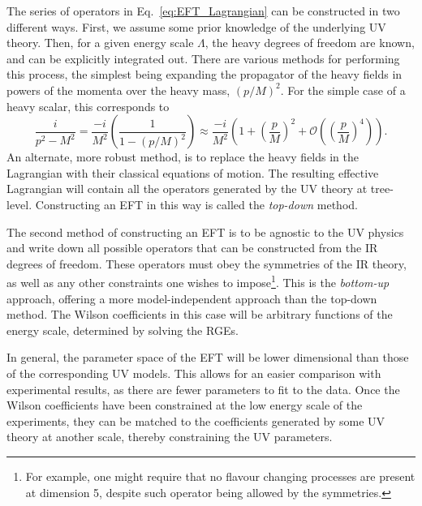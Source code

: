 The series of operators in Eq.~\ref*{eq:EFT_Lagrangian} can be constructed in two different ways. First, we assume some prior knowledge of the underlying UV theory. Then, for a given energy scale $\Lambda$, the heavy degrees of freedom are known, and can be explicitly integrated out. There are various methods for performing this process, the simplest being expanding the propagator of the heavy fields in powers of the momenta over the heavy mass, $(p/M)^2$. For the simple case of a heavy scalar, this corresponds to 
\begin{equation}
    \frac{i}{p^2 - M^2} = \frac{-i}{M^2}\left(\frac{1}{1 - (p/M)^2}\right)\approx \frac{-i}{M^2}\left( 1 + \left(\frac{p}{M}\right)^2 + \mathcal{O}\left(\left(\frac{p}{M}\right)^4\right)\right).
\end{equation}
An alternate, more robust method, is to replace the heavy fields in the Lagrangian with their classical equations of motion. The resulting effective Lagrangian will contain all the operators generated by the UV theory at tree-level.
Constructing an EFT in this way is called the \textit{top-down} method.

The second method of constructing an EFT is to be agnostic to the UV physics and write down all possible operators that can be constructed from the IR degrees of freedom. These operators must obey the symmetries of the IR theory, as well as any other constraints one wishes to impose\footnote{For example, one might require that no flavour changing processes are present at dimension 5, despite such operator being allowed by the symmetries.}. This is the \textit{bottom-up} approach, offering a more model-independent approach than the top-down method. The Wilson coefficients in this case will be arbitrary functions of the energy scale, determined by solving the RGEs.

In general, the parameter space of the EFT will be lower dimensional than those of the corresponding UV models. This allows for an easier comparison with experimental results, as there are fewer parameters to fit to the data. Once the Wilson coefficients have been constrained at the low energy scale of the experiments, they can be matched to the coefficients generated by some UV theory at another scale, thereby constraining the UV parameters. 

